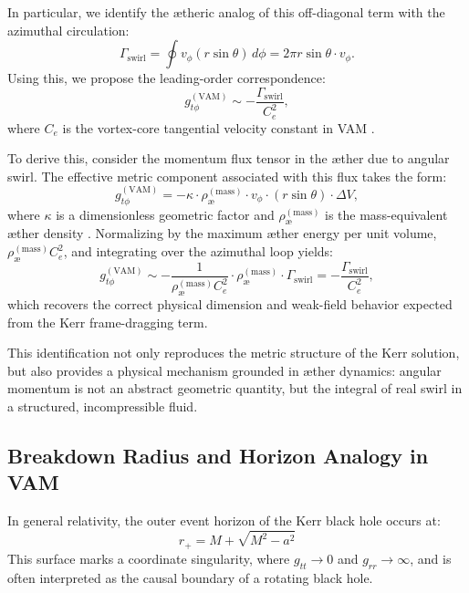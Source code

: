 \documentclass[twocolumn,aps,pre,floatfix,nofootinbib]{revtex4-2}
\begin{document}
    In particular, we identify the ætheric analog of this off-diagonal term with the azimuthal circulation:
    \begin{equation}
        \Gamma_{\text{swirl}} = \oint v_\phi (r \sin\theta) \, d\phi = 2\pi r \sin\theta \cdot v_\phi.
    \end{equation}
    Using this, we propose the leading-order correspondence:
    \begin{equation}
        g_{t\phi}^{(\text{VAM})} \sim -\frac{\Gamma_{\text{swirl}}}{C_e^2}, \label{eq:gtphi_vam}
    \end{equation}
    where $C_e$ is the vortex-core tangential velocity constant in VAM \cite{VAM-0}.

    To derive this, consider the momentum flux tensor in the æther due to angular swirl. The effective metric component associated with this flux takes the form:
    \begin{equation}
        g_{t\phi}^{(\text{VAM})} = - \kappa \cdot \rho_{\text{\ae}}^{(\text{mass})} \cdot v_\phi \cdot (r \sin\theta) \cdot \Delta V,
    \end{equation}
    where $\kappa$ is a dimensionless geometric factor and $\rho_{\text{\ae}}^{(\text{mass})}$ is the mass-equivalent æther density \cite{VAM-6}. Normalizing by the maximum æther energy per unit volume, $\rho_{\text{\ae}}^{(\text{mass})} C_e^2$, and integrating over the azimuthal loop yields:
    \begin{equation}
        g_{t\phi}^{(\text{VAM})} \sim -\frac{1}{\rho_{\text{\ae}}^{(\text{mass})} C_e^2} \cdot \rho_{\text{\ae}}^{(\text{mass})} \cdot \Gamma_{\text{swirl}} = -\frac{\Gamma_{\text{swirl}}}{C_e^2},
    \end{equation}
    which recovers the correct physical dimension and weak-field behavior expected from the Kerr frame-dragging term.

    This identification not only reproduces the metric structure of the Kerr solution, but also provides a physical mechanism grounded in æther dynamics: angular momentum is not an abstract geometric quantity, but the integral of real swirl in a structured, incompressible fluid.




    \subsection{Breakdown Radius and Horizon Analogy in VAM}

    In general relativity, the outer event horizon of the Kerr black hole occurs at:
    \[
        r_+ = M + \sqrt{M^2 - a^2}
    \]
    This surface marks a coordinate singularity, where \( g_{tt} \to 0 \) and \( g_{rr} \to \infty \), and is often interpreted as the causal boundary of a rotating black hole.
\end{document}
